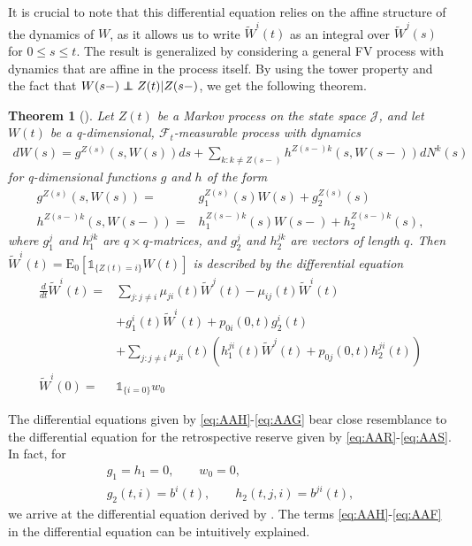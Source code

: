 \documentclass[12pt]{article}
\newcommand{\E}{\text{E}}
\newcommand{\indic}[1]{\mathds{1}_{ \{ #1 \} }}
\newcommand{\noin}{\noindent}
\newcommand\independent{\protect\mathpalette{\protect\independenT}{\perp}}
\def\independenT#1#2{\mathrel{\rlap{$#1#2$}\mkern2mu{#1#2}}}
\theoremstyle{my_thm}
\newtheorem{thm}{Theorem}[section]
\begin{document}
It is crucial to note that this differential equation relies on the affine structure of the dynamics of $W$, as it allows us to write $\tilde{W}^i(t)$ as an integral over $\tilde{W}^j(s)$ for $0\leq s \leq t$. The result is generalized by considering a general FV process with dynamics that are affine in the process itself. By using the tower property and the fact that $W(s-)\independent Z(t)|Z(s-)$, we get the following theorem.
\begin{thm}[]
\label{thm:Diff_1}
Let $Z(t)$ be a Markov process on the state space $\mathcal{J}$, and let $W(t)$ be a q-dimensional, $\mathcal{F}_t$-measurable process with dynamics
\begin{align*}
dW(s)=  g^{Z(s)}(s,W(s))ds+
 \sum_{k:k \neq Z(s-)} h^{Z(s-)k}(s,W(s-)) dN^k(s) 
\end{align*}
for q-dimensional functions $g$ and $h$ of the form
\begin{align*}
g^{Z(s)}(s,W(s))=&g^{Z(s)}_1(s) W(s)+g_2^{Z(s)}(s)
\\
h^{Z(s-)k}(s,W(s-))=&h_1^{Z(s-)k}(s) W(s-)+h_2^{Z(s-)k}(s),
\end{align*}
where $g_1^j$ and $h^{jk}_1$ are $q\times q$-matrices, and $g^j_2$ and $h^{jk}_2$ are vectors of length $q$. Then $\tilde{W}^i(t)=\E_0[\indic{Z(t)=i}W(t)]$ is described by the differential equation
\begin{align}
\frac{d}{dt}\tilde{W}^i(t)=&
\sum_{j:j \neq i} \mu_{ji}(t) \tilde{W}^j(t)-\mu_{ij}(t)\tilde{W}^i(t)
 \label{eq:AAH} \\
&+
 g_1^i(t)\tilde{W}^i(t)+p_{0i}(0,t)g_2^i(t)
 \label{eq:AAI}\\
&+
\sum_{j:j\neq i} \mu_{ji}(t) \left(  h_1^{ji}(t) \tilde{W}^j(t) + p_{0j}(0,t)h_2^{ji}(t)\right) \label{eq:AAF}
\\
\tilde{W}^i(0)=&\indic{i=0}w_0 \label{eq:AAG}
\end{align}
\end{thm}
\noin The differential equations given by \eqref{eq:AAH}-\eqref{eq:AAG} bear close resemblance to the differential equation for the retrospective reserve given by \eqref{eq:AAR}-\eqref{eq:AAS}. In fact, for
\begin{gather*}
g_1=h_1=0, \qquad w_0=0,
\\
g_2(t,i)=b^{i}(t),\qquad h_2(t,j,i)=b^{ji}(t),
\end{gather*}
we arrive at the differential equation derived by \citet{Norberg}. The terms \eqref{eq:AAH}-\eqref{eq:AAF} in the differential equation can be intuitively explained.
\\[12pt]
\end{document}
